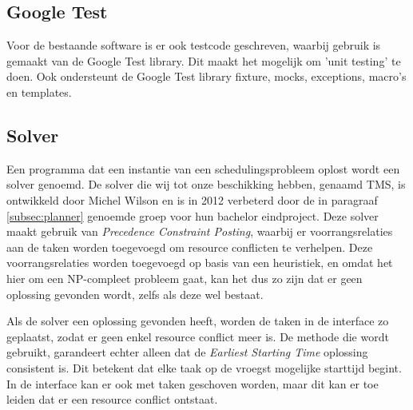 \subsection{Google Test}
Voor de bestaande software is er ook testcode geschreven, waarbij gebruik is gemaakt van de Google Test library. Dit maakt het mogelijk om 'unit testing' te doen. Ook ondersteunt de Google Test library fixture, mocks, exceptions, macro's en templates.

\subsection{Solver}

Een programma dat een instantie van een schedulingsprobleem oplost wordt een solver genoemd. De solver die wij tot onze beschikking hebben, genaamd TMS, is ontwikkeld door Michel Wilson en is in 2012 verbeterd door de in paragraaf \ref{subsec:planner} genoemde groep voor hun bachelor eindproject. Deze solver maakt gebruik van \emph{Precedence Constraint Posting}, waarbij er voorrangsrelaties aan de taken worden toegevoegd om resource conflicten te verhelpen. \cite{seminarium2014} Deze voorrangsrelaties worden toegevoegd op basis van een heuristiek, en omdat het hier om een NP-compleet probleem gaat, kan het dus zo zijn dat er geen oplossing gevonden wordt, zelfs als deze wel bestaat.

Als de solver een oplossing gevonden heeft, worden de taken in de interface zo geplaatst, zodat er geen enkel resource conflict meer is. De methode die wordt gebruikt, garandeert echter alleen dat de \emph{Earliest Starting Time} oplossing consistent is. Dit betekent dat elke taak op de vroegst mogelijke starttijd begint. In de interface kan er ook met taken geschoven worden, maar dit kan er toe leiden dat er een resource conflict ontstaat. 
